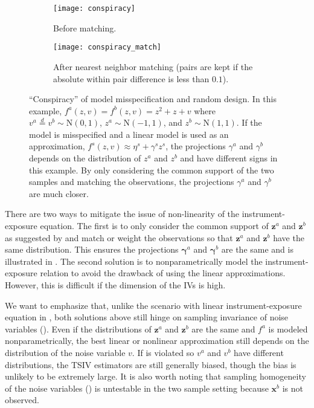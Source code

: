 \documentclass[preprint]{imsart}
\begin{document}
\begin{figure}[t]
  \centering
  \begin{subfigure}[t]{0.48\textwidth}
    \texttt{[image: conspiracy]}
    \caption{Before matching.}
  \end{subfigure}
  \begin{subfigure}[t]{0.48\textwidth}
    \texttt{[image: conspiracy\_match]}
    \caption{After nearest neighbor matching (pairs are kept if the
      absolute within pair difference is less than $0.1$).}
  \end{subfigure}
  \caption{``Conspiracy'' of model misspecification and random
    design. In this example, $f^a(z,v) = f^b(z,v) = z^2 + z + v$ where
    $v^a \overset{d}{=} v^b \sim \mathrm{N}(0, 1)$, $z^a \sim
    \mathrm{N}(-1,1)$, and $z^b \sim \mathrm{N}(1,1)$. If the model is
    misspecified and a linear model is used as an approximation,
    $f^s(z, v) \approx \eta^s + \gamma^s z^s$, the projections
    $\gamma^a$ and $\gamma^b$ depends on the distribution of $z^a$ and
    $z^b$ and have different signs in this example. By only considering
    the common support of the two samples and matching the observations,
    the projections $\gamma^a$ and $\gamma^b$ are much closer.}
  \label{fig:conspiracy}
\end{figure}

There are two ways to mitigate the issue of non-linearity of the
instrument-exposure equation. The first is to only consider the common
support of $\mathbf{z}^a$ and $\mathbf{z}^b$ as suggested by
\citet{lawlor2016commentary} and match or weight the observations so that
$\mathbf{z}^a$ and $\mathbf{z}^b$ have the same distribution. This
ensures the projections $\bm{\gamma}^a$ and $\bm{\gamma}^b$ are the
same and is illustrated in . The second solution is to nonparametrically model the
instrument-exposure relation to avoid the drawback of using the linear
approximations. However, this is difficult if the dimension of the IVs
is high.

We want to emphasize that, unlike the scenario with linear
instrument-exposure equation in , both
solutions above still hinge on sampling
invariance of noise variables (). Even
if the distributions of $\mathbf{z}^a$ and $\mathbf{z}^b$ are the same
and $f^a$ is modeled nonparametrically, the best linear or nonlinear
approximation still depends on the distribution of the noise variable
$v$. If  is violated so $v^a$ and $v^b$
have different distributions, the TSIV estimators are still generally
biased, though the bias is unlikely to be extremely large. It is also worth
noting that sampling homogeneity of the noise variables
() is untestable in the two sample
setting because $\mathbf{x}^b$ is not observed.
\end{document}
